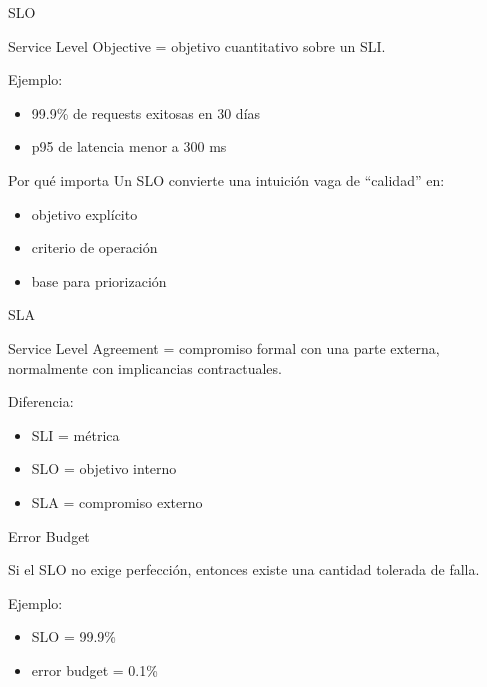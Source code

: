 \documentclass[institutional,screen,none]{ua-engineering-v6-beamer}
\begin{document}

\begin{frame}{SLO}
\begin{block}{}
Service Level Objective = objetivo cuantitativo sobre un SLI.
\end{block}

\pause

Ejemplo:
\begin{itemize}
\item 99.9\% de requests exitosas en 30 días
\item p95 de latencia menor a 300 ms
\end{itemize}
\end{frame}

\begin{frame}{Por qué importa}
Un SLO convierte una intuición vaga de “calidad” en:
\begin{itemize}
\item objetivo explícito
\item criterio de operación
\item base para priorización
\end{itemize}
\end{frame}


\begin{frame}{SLA}
\begin{block}{}
Service Level Agreement = compromiso formal con una parte externa, normalmente con implicancias contractuales.
\end{block}

\pause

Diferencia:
\begin{itemize}
\item SLI = métrica
\item SLO = objetivo interno
\item SLA = compromiso externo
\end{itemize}
\end{frame}


\begin{frame}{Error Budget}
\begin{block}{}
Si el SLO no exige perfección, entonces existe una cantidad tolerada de falla.
\end{block}

\pause

Ejemplo:
\begin{itemize}
\item SLO = 99.9\%
\item error budget = 0.1\%
\end{itemize}
\end{frame}
\end{document}

